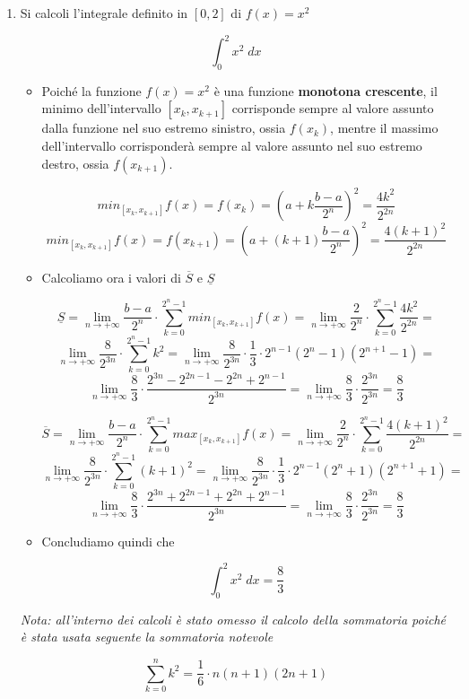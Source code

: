 \documentclass[a4paper, 12pt]{report}
\begin{document}
\begin{enumerate}
        \[ \sum_{k=0}^{n} k = \frac{n \cdot (n+1)}{2}\]
        \newpage
        
        \item Si calcoli l'integrale definito in $[0, 2]$ di $f(x) = x^2$
        
        \[ \int_{0}^{2} x^2 \; dx\]
        
        \begin{itemize}
            \item Poiché la funzione $f(x) = x^2$ è una funzione \textbf{monotona crescente}, il minimo dell'intervallo $[x_k, x_{k+1}]$ corrisponde sempre al valore assunto dalla funzione nel suo estremo sinistro, ossia $f(x_k)$, mentre il massimo dell'intervallo corrisponderà sempre al valore assunto nel suo estremo destro, ossia $f(x_{k+1})$. 
            
            \[min_{[x_k, x_{k+1}]} f(x) = f(x_k) = \left ( a+k \frac{b-a}{2^n} \right)^2 = \frac{4k^2}{2^{2n}}\]
            \[min_{[x_k, x_{k+1}]} f(x) = f(x_{k+1}) = \left ( a+(k+1) \frac{b-a}{2^n} \right)^2 = \frac{4(k+1)^2}{2^{2n}}\]
            
            \item Calcoliamo ora i valori di $\overline{S}$ e $\underline{S}$
            
            \[ \underline{S} = \lim_{n \to +\infty} \frac{b-a}{2^n} \cdot \sum_{k=0}^{2^n-1} min_{[x_k, x_{k+1}]} f(x) = \lim_{n \to +\infty} \frac{2}{2^n} \cdot \sum_{k=0}^{2^n-1} \frac{4k^2}{2^{2n}} = \]
            \[\lim_{n \to +\infty} \frac{8}{2^{3n}} \cdot \sum_{k=0}^{2^n-1} k^2 = \lim_{n \to +\infty} \frac{8}{2^{3n}} \cdot \frac{1}{3} \cdot 2^{n-1}(2^n-1)(2^{n+1}-1) =  \]
            \[\lim_{n \to +\infty} \frac{8}{3} \cdot \frac{2^{3n}-2^{2n-1}-2^{2n}+2^{n-1}}{2^{3n}} = \lim_{n \to +\infty} \frac{8}{3} \cdot \frac{2^{3n}}{2^{3n}} = \frac{8}{3}\]
            
            \[ \overline{S} = \lim_{n \to +\infty} \frac{b-a}{2^n} \cdot \sum_{k=0}^{2^n-1} max_{[x_k, x_{k+1}]} f(x) = \lim_{n \to +\infty} \frac{2}{2^n} \cdot \sum_{k=0}^{2^n-1} \frac{4(k+1)^2}{2^{2n}} = \]
            \[\lim_{n \to +\infty} \frac{8}{2^{3n}} \cdot \sum_{k=0}^{2^n-1} (k+1)^2 = \lim_{n \to +\infty} \frac{8}{2^{3n}} \cdot \frac{1}{3} \cdot 2^{n-1}(2^n+1)(2^{n+1}+1) =  \]
            \[\lim_{n \to +\infty} \frac{8}{3} \cdot \frac{2^{3n}+2^{2n-1}+2^{2n}+2^{n-1}}{2^{3n}} = \lim_{n \to +\infty} \frac{8}{3} \cdot \frac{2^{3n}}{2^{3n}} = \frac{8}{3}\]
            
            \item Concludiamo quindi che 
            
            \[ \int_{0}^{2} x^2 \; dx = \frac{8}{3}\]
            
        \end{itemize}
        
        \quad
        
        \textit{Nota: all'interno dei calcoli è stato omesso il calcolo della sommatoria poiché è stata usata seguente la sommatoria notevole}
            
            \[ \sum_{k=0}^{n} k^2 = \frac{1}{6} \cdot n (n+1)(2n+1)\]
    \end{enumerate}
    
\end{document}
